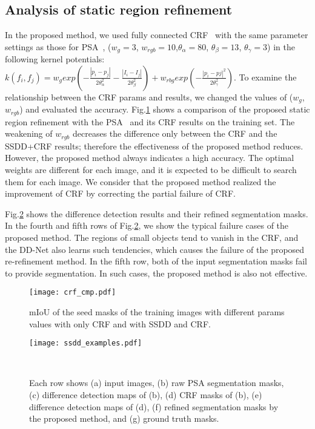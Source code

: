 \documentclass[10pt,twocolumn,letterpaper]{article}
\begin{document}
\subsection{Analysis of static region refinement}
In the proposed method, we used fully connected CRF~\cite{kra11} with the same parameter settings as those for PSA~\cite{psa}, ($w_{g}=3$, $w_{rgb}=10$,$\theta_{\alpha}=80$, $\theta_{\beta}=13$, $\theta_{\gamma}=3$) in the following kernel potentials: $k(f_{i},f_{j})=w_{g}exp\left(-\frac{|p_{i}-p_{j}|}{2\theta_{\alpha}^{2}}-\frac{|I_{i}-I_{j}|}{2\theta_{\beta}^2}\right)+w_{rbg}exp\left(-\frac{|p_{i}-p{j}|^2}{2\theta_{\gamma}^{2}}\right)$.
To examine the relationship between the CRF params and results, we changed the values of ($w_{g}$, $w_{rgb}$) and evaluated the accuracy. 
Fig.\ref{crf_cmp_fig} shows a comparison of the proposed static region refinement with the PSA~\cite{psa} and its CRF results on the training set.
The weakening of $w_{rgb}$ decreases the difference only between the CRF and the SSDD+CRF results; therefore the effectiveness of the proposed method reduces. 
However, the proposed method always indicates a high accuracy. 
The optimal weights are different for each image, and it is expected to be difficult to search them for each image. 
We consider that the proposed method realized the improvement of CRF by correcting the partial failure of CRF.

Fig.\ref{exdp2} shows the difference detection results and their refined segmentation masks.
In the fourth and fifth rows of Fig.\ref{exdp2}, we show the typical failure cases of the proposed method.
The regions of small objects tend to vanish in the CRF, and the DD-Net also learns such tendencies, which causes the failure of the proposed re-refinement method.
In the fifth row, both of the input segmentation masks fail to provide segmentation.
In such cases, the proposed method is also not effective.

\begin{figure}[tb]
\begin{center}
\texttt{[image: crf\_cmp.pdf]}
\caption{mIoU of the seed masks of the training images with
different params values with only CRF and with SSDD and CRF.} \label{crf_cmp_fig}
\end{center}
\end{figure}
\begin{figure}[tb]
  \begin{center}
\texttt{[image: ssdd\_examples.pdf]}

\smallskip
\caption{Each row shows (a) input images, (b) raw PSA segmentation masks, (c) difference detection maps of (b), (d) CRF masks of (b), (e) difference detection maps of (d), (f) refined segmentation masks by the proposed method, and (g) ground truth masks.}
\label{exdp2}
\vskip -6mm~
\end{center}
\end{figure}
\end{document}

